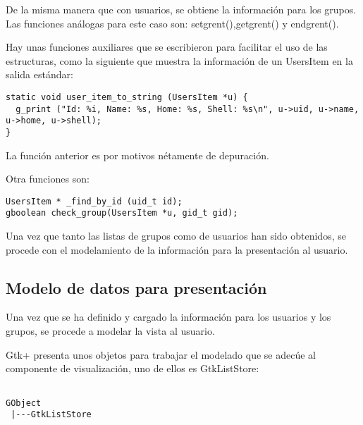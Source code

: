 \documentclass[letterpaper,10pt]{article}
\begin{document}
De la misma manera que con usuarios, se obtiene la información para los grupos. 
Las funciones análogas para este caso son: setgrent(),getgrent() y endgrent().

Hay unas funciones auxiliares que se escribieron para facilitar el uso de las estructuras,
como la siguiente que muestra la información de un UsersItem en la salida estándar:
\begin{verbatim}
static void user_item_to_string (UsersItem *u) {
  g_print ("Id: %i, Name: %s, Home: %s, Shell: %s\n", u->uid, u->name, u->home, u->shell);
}
\end{verbatim}
La función anterior es por motivos nétamente de depuración.

Otra funciones son:
\begin{verbatim}
UsersItem * _find_by_id (uid_t id);
gboolean check_group(UsersItem *u, gid_t gid);
\end{verbatim}


Una vez que tanto las listas de grupos como de usuarios han sido obtenidos, 
se procede con el modelamiento de la información para la presentación al usuario.

\subsection{Modelo de datos para presentación}
Una vez que se ha definido y cargado la información para los usuarios y los grupos,
se procede a modelar la vista al usuario.

Gtk+ presenta unos objetos para trabajar el modelado que se adecúe al 
componente de visualización, uno de ellos es GtkListStore:

\begin{verbatim}

GObject
 |---GtkListStore

\end{verbatim}
\end{document}
